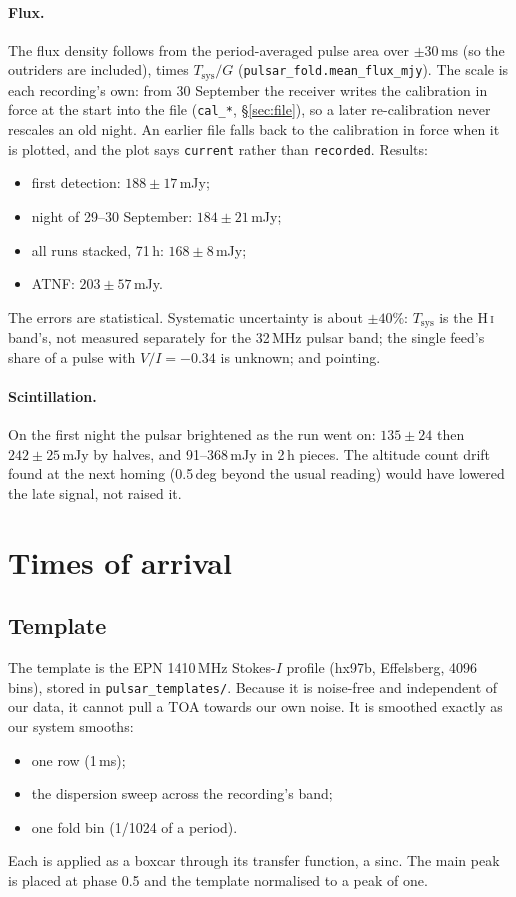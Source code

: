 \documentclass[11pt,a4paper]{article}
\newcommand{\code}[1]{\texttt{#1}}
\begin{document}
\paragraph{Flux.} The flux density follows from the period-averaged pulse area over $\pm30$\,ms (so the outriders are included), times $T_\mathrm{sys}/G$ (\code{pulsar\_fold.mean\_flux\_mjy}). The scale is each recording's own: from 30 September the receiver writes the calibration in force at the start into the file (\code{cal\_*}, \S\ref{sec:file}), so a later re-calibration never rescales an old night. An earlier file falls back to the calibration in force when it is plotted, and the plot says \code{current} rather than \code{recorded}. Results:
\begin{itemize}
\item first detection: $188\pm17$\,mJy;
\item night of 29--30 September: $184\pm21$\,mJy;
\item all runs stacked, 71\,h: $168\pm8$\,mJy;
\item ATNF: $203\pm57$\,mJy.
\end{itemize}
The errors are statistical. Systematic uncertainty is about $\pm40\%$: $T_\mathrm{sys}$ is the H\,\textsc{i} band's, not measured separately for the 32\,MHz pulsar band; the single feed's share of a pulse with $V/I = -0.34$ is unknown; and pointing.

\paragraph{Scintillation.} On the first night the pulsar brightened as the run went on: $135\pm24$ then $242\pm25$\,mJy by halves, and 91--368\,mJy in 2\,h pieces. The altitude count drift found at the next homing (0.5\,deg beyond the usual reading) would have lowered the late signal, not raised it.

\section{Times of arrival}
\label{sec:toa}

\subsection{Template}
The template is the EPN 1410\,MHz Stokes-$I$ profile (hx97b, Effelsberg, 4096 bins), stored in \code{pulsar\_templates/}. Because it is noise-free and independent of our data, it cannot pull a TOA towards our own noise. It is smoothed exactly as our system smooths:
\begin{itemize}
\item one row (1\,ms);
\item the dispersion sweep across the recording's band;
\item one fold bin (1/1024 of a period).
\end{itemize}
Each is applied as a boxcar through its transfer function, a sinc. The main peak is placed at phase 0.5 and the template normalised to a peak of one.
\end{document}
